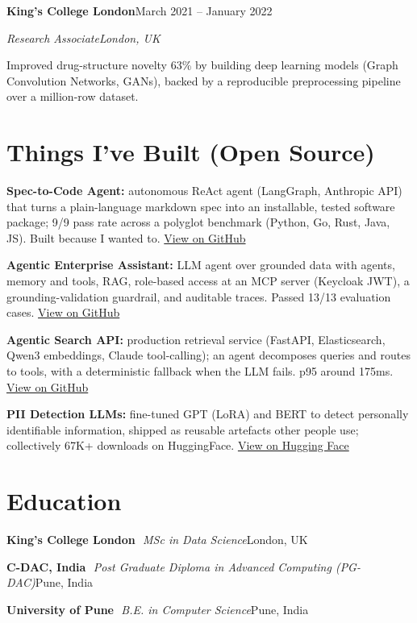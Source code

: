 \documentclass[10pt,a4paper]{article}
\newcommand{\entry}[4]{%
  {\color{company}\bfseries #1}\hfill {\color{muted}#2}\par
  \vspace{1pt}
  {\itshape #3}\hfill {\color{muted}\itshape #4}\par
  \vspace{3pt}%
}
\newcommand{\sep}{\,\textcolor{accent!60}{\textbar}\,}
\begin{document}
\entry{King's College London}{March 2021 -- January 2022}{Research Associate}{London, UK}
\begin{tight}
  \item Improved drug-structure novelty 63\% by building deep learning models (Graph Convolution Networks, GANs), backed by a reproducible preprocessing pipeline over a million-row dataset.
\end{tight}

\section{Things I've Built (Open Source)}
\begin{tight}
  \item \textbf{Spec-to-Code Agent:} autonomous ReAct agent (LangGraph, Anthropic API) that turns a plain-language markdown spec into an installable, tested software package; 9/9 pass rate across a polyglot benchmark (Python, Go, Rust, Java, JS). Built because I wanted to. \href{https://github.com/abhijeetscode/Spec-to-Code-Agent}{View on GitHub}
  \item \textbf{Agentic Enterprise Assistant:} LLM agent over grounded data with agents, memory and tools, RAG, role-based access at an MCP server (Keycloak JWT), a grounding-validation guardrail, and auditable traces. Passed 13/13 evaluation cases. \href{https://github.com/abhijeetscode/Agentic-Enterprise-Assistant}{View on GitHub}
  \item \textbf{Agentic Search API:} production retrieval service (FastAPI, Elasticsearch, Qwen3 embeddings, Claude tool-calling); an agent decomposes queries and routes to tools, with a deterministic fallback when the LLM fails. p95 around 175ms. \href{https://github.com/abhijeetscode/search-agent}{View on GitHub}
  \item \textbf{PII Detection LLMs:} fine-tuned GPT (LoRA) and BERT to detect personally identifiable information, shipped as reusable artefacts other people use; collectively 67K+ downloads on HuggingFace. \href{https://huggingface.co/ab-ai/pii_model}{View on Hugging Face}
\end{tight}

\section{Education}
{\color{company}\bfseries King's College London} \sep {\itshape MSc in Data Science}\hfill {\color{muted}London, UK}\par\vspace{1pt}
{\color{company}\bfseries C-DAC, India} \sep {\itshape Post Graduate Diploma in Advanced Computing (PG-DAC)}\hfill {\color{muted}Pune, India}\par\vspace{1pt}
{\color{company}\bfseries University of Pune} \sep {\itshape B.E. in Computer Science}\hfill {\color{muted}Pune, India}\par
\end{document}
